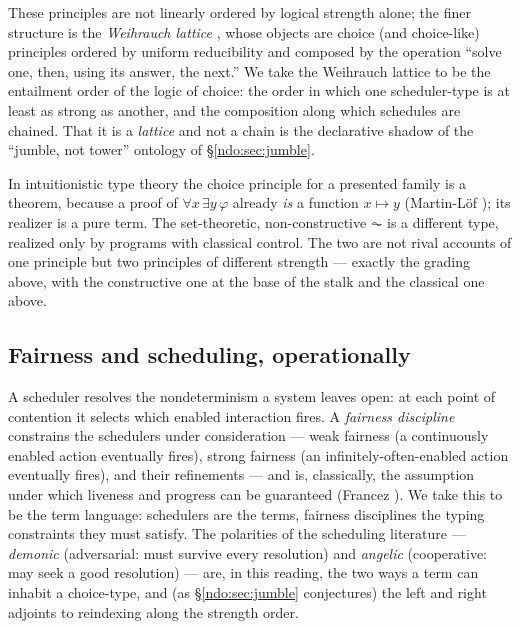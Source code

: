 \noindent
These principles are not linearly ordered by logical strength alone; the finer structure is the
\emph{Weihrauch lattice} \cite{weihrauch}, whose objects are choice (and choice-like) principles
ordered by uniform reducibility and composed by the operation ``solve one, then, using its answer,
the next.'' We take the Weihrauch lattice to be the entailment order of the logic of choice: the
order in which one scheduler-type is at least as strong as another, and the composition along which
schedules are chained. That it is a \emph{lattice} and not a chain is the declarative shadow of the
``jumble, not tower'' ontology of \S\ref{ndo:sec:jumble}.

\begin{remark}
In intuitionistic type theory the choice principle for a presented family is a theorem, because
a proof of $\forall x\,\exists y\,\varphi$ already \emph{is} a function $x \mapsto y$ (Martin-L\"of
\cite{martinlof}); its realizer is a pure term. The set-theoretic, non-constructive $\AC$ is a
different type, realized only by programs with classical control. The two are not rival accounts of
one principle but two principles of different strength --- exactly the grading above, with the
constructive one at the base of the stalk and the classical one above.
\end{remark}

\subsection{Fairness and scheduling, operationally}

A scheduler resolves the nondeterminism a system leaves open: at each point of contention it
selects which enabled interaction fires. A \emph{fairness discipline} constrains the schedulers
under consideration --- weak fairness (a continuously enabled action eventually fires), strong
fairness (an infinitely-often-enabled action eventually fires), and their refinements --- and is,
classically, the assumption under which liveness and progress can be guaranteed (Francez
\cite{francez}). We take this to be the term language: schedulers are the terms, fairness
disciplines the typing constraints they must satisfy. The polarities of the scheduling literature
--- \emph{demonic} (adversarial: must survive every resolution) and \emph{angelic} (cooperative:
may seek a good resolution) --- are, in this reading, the two ways a term can inhabit a choice-type,
and (as \S\ref{ndo:sec:jumble} conjectures) the left and right adjoints to reindexing along the strength
order.

